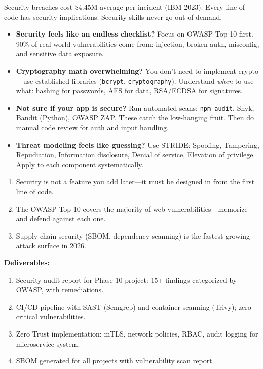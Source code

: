 \documentclass[11pt, a4paper, oneside]{report}
\begin{document}
\begin{realworldbox}
Security breaches cost \$4.45M average per incident (IBM 2023). Every line of code has security implications. Security skills never go out of demand.
\end{realworldbox}


\begin{stuckbox}
\begin{itemize}[leftmargin=*]
\item \textbf{Security feels like an endless checklist?} Focus on OWASP Top 10 first. 90\% of real-world vulnerabilities come from: injection, broken auth, misconfig, and sensitive data exposure.
\item \textbf{Cryptography math overwhelming?} You don't need to implement crypto---use established libraries (\texttt{bcrypt}, \texttt{cryptography}). Understand \emph{when} to use what: hashing for passwords, AES for data, RSA/ECDSA for signatures.
\item \textbf{Not sure if your app is secure?} Run automated scans: \texttt{npm audit}, Snyk, Bandit (Python), OWASP ZAP. These catch the low-hanging fruit. Then do manual code review for auth and input handling.
\item \textbf{Threat modeling feels like guessing?} Use STRIDE: Spoofing, Tampering, Repudiation, Information disclosure, Denial of service, Elevation of privilege. Apply to each component systematically.
\end{itemize}
\end{stuckbox}


\begin{takeawaybox}
\begin{enumerate}[leftmargin=*]
\item Security is not a feature you add later---it must be designed in from the first line of code.
\item The OWASP Top 10 covers the majority of web vulnerabilities---memorize and defend against each one.
\item Supply chain security (SBOM, dependency scanning) is the fastest-growing attack surface in 2026.
\end{enumerate}
\end{takeawaybox}

\begin{milestonebox}
\textbf{Deliverables:}
\begin{enumerate}[leftmargin=*]
\item Security audit report for Phase 10 project: 15+ findings categorized by OWASP, with remediations.
\item CI/CD pipeline with SAST (Semgrep) and container scanning (Trivy); zero critical vulnerabilities.
\item Zero Trust implementation: mTLS, network policies, RBAC, audit logging for microservice system.
\item SBOM generated for all projects with vulnerability scan report.
\end{enumerate}
\end{milestonebox}
\end{document}
